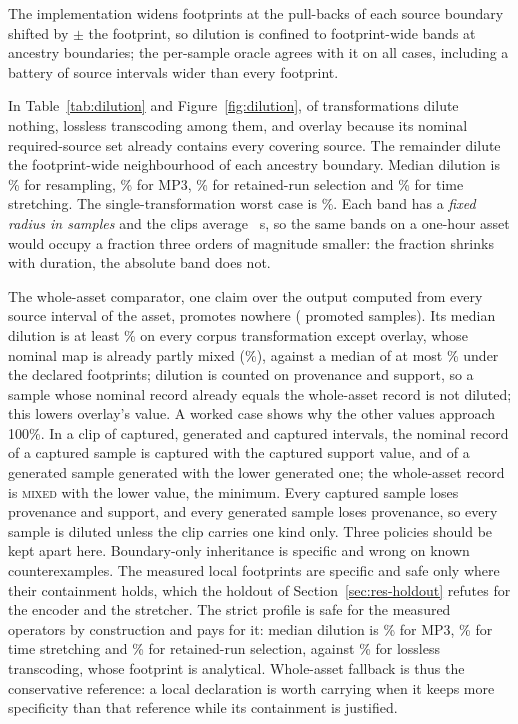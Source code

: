 \documentclass[preprint,3p,11pt,authoryear]{elsarticle}
\begin{document}
The implementation widens footprints at the pull-backs of each source boundary
shifted by $\pm$ the footprint, so dilution is confined to footprint-wide bands
at ancestry boundaries; the per-sample oracle agrees with it on all \Hcases{}
cases, including a battery of source intervals wider than every footprint.

In Table~\ref{tab:dilution} and Figure~\ref{fig:dilution}, \IzeroTf{} of \ItfCount{}
transformations dilute nothing, lossless transcoding among them, and overlay
because its nominal required-source set already contains every covering
source. The remainder
dilute the footprint-wide neighbourhood of each ancestry boundary. Median
dilution is \IresampleMedianPct{}\% for resampling, \ImpThreeMedianPct{}\% for
MP3, \IsilenceMedianPct{}\% for retained-run selection and \IstretchMedianPct{}\% for
time stretching. The single-transformation worst case is \ImaxAnyPct{}\%.
Each band has a \emph{fixed radius in samples} and the clips average
\CmeanDurS{}~s, so the same bands on a one-hour asset would occupy a fraction
three orders of magnitude smaller: the fraction shrinks with duration, the
absolute band does not.

The whole-asset comparator, one claim over the output computed from every source
interval of the asset, promotes nowhere (\IwholePromoted{} promoted samples). Its median dilution is
at least \IwholeMinMedianPct{}\% on every corpus transformation except overlay, whose
nominal map is already partly mixed (\IwholeOverlayPct{}\%), against a median of
at most \IemMaxMedianPct{}\% under the declared footprints; dilution is counted
on provenance and support, so a sample whose nominal record already equals the
whole-asset record is not diluted; this lowers overlay's value. A worked case
shows why the other values approach 100\%. In a clip of captured, generated and
captured intervals, the nominal record of a captured sample is captured with the
captured support value, and of a generated sample generated with the lower
generated one; the whole-asset record is \textsc{mixed} with the lower value,
the minimum. Every captured sample loses provenance and support, and every
generated sample loses provenance, so every sample is diluted unless the clip
carries one kind only. Three policies
should be kept apart here. Boundary-only inheritance is specific and wrong on
known counterexamples. The measured local footprints are specific and safe only
where their containment holds, which the holdout of
Section~\ref{sec:res-holdout} refutes for the encoder and the stretcher. The
strict profile is safe for the measured operators by construction and pays for
it: median dilution is \IstrictMpPct{}\% for MP3, \IstrictStPct{}\% for time stretching and
\IstrictSelPct{}\% for retained-run selection,
against \IstrictFlacPct{}\% for lossless transcoding, whose footprint is
analytical. Whole-asset fallback is thus the conservative reference: a local
declaration is worth carrying when it keeps more specificity than that reference
while its containment is justified.
\end{document}
